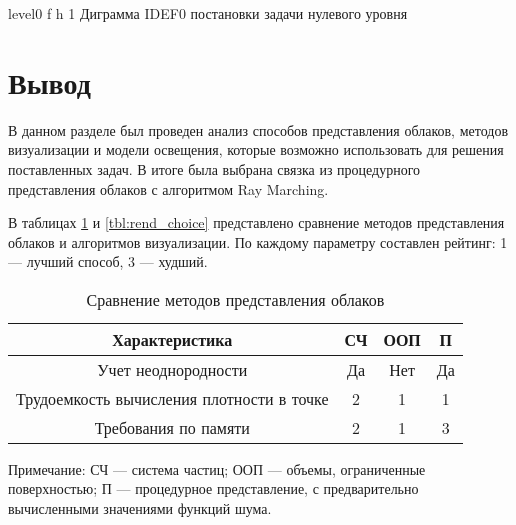 {level0} %
{f} %
{h} %
{1\textwidth} %
{Диграмма IDEF0 постановки задачи нулевого уровня} %



\section*{Вывод}

В данном разделе был проведен анализ способов представления облаков, методов визуализации и модели освещения, которые возможно использовать для решения поставленных задач. В итоге была выбрана связка из процедурного представления облаков с алгоритмом Ray Marching.

В таблицах \ref{tbl:repr_choice} и \ref{tbl:rend_choice} представлено сравнение методов представления облаков и алгоритмов визуализации. По каждому параметру составлен рейтинг: 1 --- лучший способ, 3 --- худший.

\begin{table}[h]
	\begin{center}
		\begin{threeparttable}
			\captionsetup{justification=raggedright,singlelinecheck=off}
			\caption{Сравнение методов представления облаков}
			\label{tbl:repr_choice}
			\begin{tabular}{|c|c|c|c|}
				\hline
				Характеристика &  СЧ  & ООП & П \\
				\hline
				Учет неоднородности &  Да  & Нет & Да \\
				\hline
				Трудоемкость вычисления плотности в точке &  2  & 1 & 1 \\
				\hline
				Требования по памяти & 2 & 1 & 3 \\
				\hline
			\end{tabular}
			\begin{tablenotes}
				\small
				\item Примечание: СЧ --- система частиц; ООП --- объемы, ограниченные поверхностью; П --- процедурное представление, с предварительно вычисленными значениями функций шума.
			\end{tablenotes}
		\end{threeparttable}
	\end{center}
\end{table}

